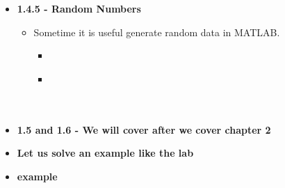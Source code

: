 \documentclass[11pt]{article}
\begin{document}
\begin{itemize}
\begin{itemize}
		\end{itemize}

	

\item \textbf{ \LARGE 1.4.5 - Random Numbers} \\
		\begin{itemize}
			\item \LARGE{Sometime it is useful generate random data in MATLAB.} \\

				\begin{itemize}
					
					\item {} \\
					\item {} \\\\\\
		
				\end{itemize}



		\end{itemize}
\item \textbf{ \LARGE 1.5 and 1.6 - We will cover after we cover chapter 2} \\
		\newpage
\item \textbf{ \LARGE Let us solve an example like the lab} \\
\newpage
\item \textbf{ \LARGE example } \\
\end{itemize}


	
\end{document}
